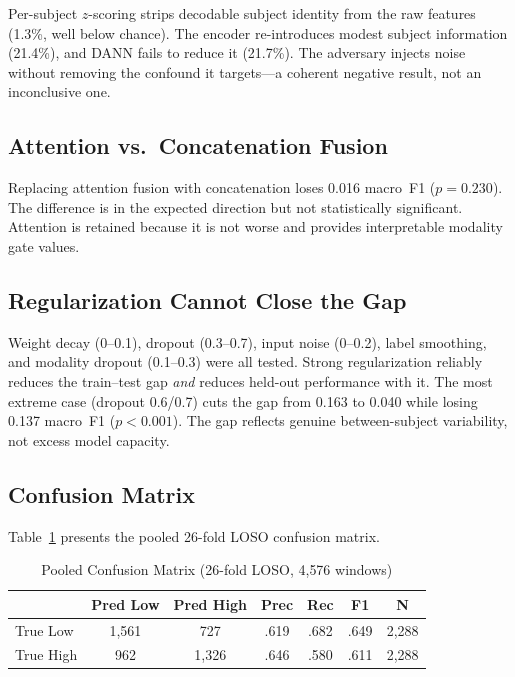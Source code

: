 \documentclass[conference]{IEEEtran}
\begin{document}
Per-subject $z$-scoring strips decodable subject identity from the raw features (1.3\%, well below chance). The encoder re-introduces modest subject information (21.4\%), and DANN fails to reduce it (21.7\%). The adversary injects noise without removing the confound it targets---a coherent negative result, not an inconclusive one.

\subsection{Attention vs.\ Concatenation Fusion}
Replacing attention fusion with concatenation loses 0.016 macro~F1 ($p = 0.230$). The difference is in the expected direction but not statistically significant. Attention is retained because it is not worse and provides interpretable modality gate values.

\subsection{Regularization Cannot Close the Gap}
Weight decay (0--0.1), dropout (0.3--0.7), input noise (0--0.2), label smoothing, and modality dropout (0.1--0.3) were all tested. Strong regularization reliably reduces the train--test gap \emph{and} reduces held-out performance with it. The most extreme case (dropout 0.6/0.7) cuts the gap from 0.163 to 0.040 while losing 0.137 macro~F1 ($p < 0.001$). The gap reflects genuine between-subject variability, not excess model capacity.

\subsection{Confusion Matrix}
Table~\ref{tab:confusion} presents the pooled 26-fold LOSO confusion matrix.

\begin{table}[t]
\centering
\caption{Pooled Confusion Matrix (26-fold LOSO, 4{,}576 windows)}
\label{tab:confusion}
\begin{tabular}{lcc|cccc}
\toprule
& \textbf{Pred Low} & \textbf{Pred High} & \textbf{Prec} & \textbf{Rec} & \textbf{F1} & \textbf{N} \\
\midrule
True Low & 1{,}561 & 727 & .619 & .682 & .649 & 2{,}288 \\
True High & 962 & 1{,}326 & .646 & .580 & .611 & 2{,}288 \\
\bottomrule
\end{tabular}
\end{table}
\end{document}
